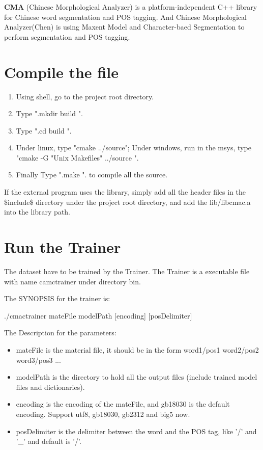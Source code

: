 {\bf CMA} (Chinese Morphological Analyzer) is a platform-independent C++ library for Chinese word segmentation and POS tagging. And Chinese Morphological Analyzer(Chen) is using Maxent Model and Character-baed Segmentation to perform segmentation and POS tagging.\section{Compile the file}\label{index_compilefile}
\begin{enumerate}
\item Using shell, go to the project root directory. \item Type ".mkdir build ". \item Type ".cd build ". \item Under linux, type "cmake ../source"; Under windows, run in the msys, type "cmake -G "Unix Makefiles" ../source ". \item Finally Type ".make ". to compile all the source. \end{enumerate}


If the external program uses the library, simply add all the header files in the \$include\$ directory under the project root directory, and add the lib/libcmac.a into the library path.\section{Run the Trainer}\label{index_runtrainer}
The dataset have to be trained by the Trainer. The Trainer is a executable file with name camctrainer under directory bin.

The SYNOPSIS for the trainer is: \par
 ./cmactrainer mateFile modelPath [encoding] [posDelimiter] \par


\par
The Description for the parameters: \begin{itemize}
\item mateFile is the material file, it should be in the form word1/pos1 word2/pos2 word3/pos3 ... \item modelPath is the directory to hold all the output files (include trained model files and dictionaries). \item encoding is the encoding of the mateFile, and gb18030 is the default encoding. Support utf8, gb18030, gb2312 and big5 now. \item posDelimiter is the delimiter between the word and the POS tag, like '/' and '\_\-' and default is '/'. \end{itemize}


